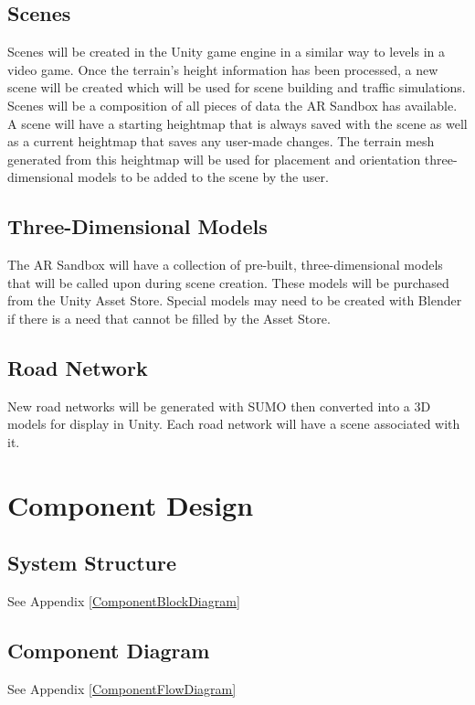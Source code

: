 \documentclass[letterpaper, 10pt, onecolumn, draftclsnofoot]{IEEEtran}
\begin{document}
    \subsection{Scenes}
       Scenes will be created in the Unity game engine in a similar way to levels in a video game. Once the terrain's height information has been processed, a new scene will be created which will be used for scene building and traffic simulations. Scenes will be a composition of all pieces of data the AR Sandbox has available. A scene will have a starting heightmap that is always saved with the scene as well as a current heightmap that saves any user-made changes. The terrain mesh generated from this heightmap will be used for placement and orientation three-dimensional models to be added to the scene by the user.
     \subsection{Three-Dimensional Models}
        The AR Sandbox will have a collection of pre-built, three-dimensional models that will be called upon during scene creation. These models will be purchased from the Unity Asset Store. Special models may need to be created with Blender if there is a need that cannot be filled by the Asset Store.
    \subsection{Road Network}
        New road networks will be generated with SUMO then converted into a 3D models for display in Unity. Each road network will have a scene associated with it. 
    
\section{Component Design}
    \subsection{System Structure}
        \begin{center}
            See Appendix \ref{ComponentBlockDiagram}
        \end{center}

    \subsection{Component Diagram}
        \begin{center}
            See Appendix \ref{ComponentFlowDiagram}
        \end{center}
        
\end{document}
